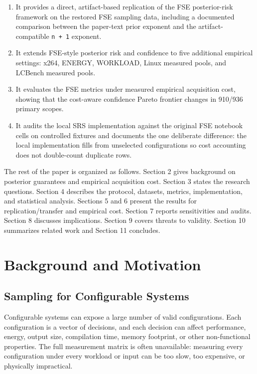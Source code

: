 \documentclass[smallcondensed]{svjour3}
\providecommand{\tightlist}{%
  \setlength{\itemsep}{0pt}\setlength{\parskip}{0pt}}
\begin{document}
\begin{enumerate}
\def\labelenumi{\arabic{enumi}.}
\tightlist
\item
  It provides a direct, artifact-based replication of the FSE
  posterior-risk framework on the restored FSE sampling data, including
  a documented comparison between the paper-text prior exponent and the
  artifact-compatible \texttt{n\ +\ 1} exponent.
\item
  It extends FSE-style posterior risk and confidence to five additional
  empirical settings: x264, ENERGY, WORKLOAD, Linux measured pools, and
  LCBench measured pools.
\item
  It evaluates the FSE metrics under measured empirical acquisition
  cost, showing that the cost-aware confidence Pareto frontier changes
  in 910/936 primary scopes.
\item
  It audits the local SRS implementation against the original FSE
  notebook cells on controlled fixtures and documents the one deliberate
  difference: the local implementation fills from unselected
  configurations so cost accounting does not double-count duplicate
  rows.
\end{enumerate}

The rest of the paper is organized as follows. Section 2 gives
background on posterior guarantees and empirical acquisition cost.
Section 3 states the research questions. Section 4 describes the
protocol, datasets, metrics, implementation, and statistical analysis.
Sections 5 and 6 present the results for replication/transfer and
empirical cost. Section 7 reports sensitivities and audits. Section 8
discusses implications. Section 9 covers threats to validity. Section 10
summarizes related work and Section 11 concludes.

\section{Background and Motivation}\label{background-and-motivation}

\subsection{Sampling for Configurable
Systems}\label{sampling-for-configurable-systems}

Configurable systems can expose a large number of valid configurations.
Each configuration is a vector of decisions, and each decision can
affect performance, energy, output size, compilation time, memory
footprint, or other non-functional properties. The full measurement
matrix is often unavailable: measuring every configuration under every
workload or input can be too slow, too expensive, or physically
impractical.
\end{document}
